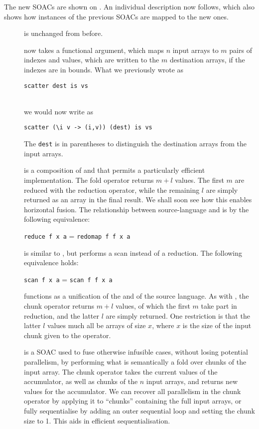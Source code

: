 The new SOACs are shown on .  An individual
description now follows, which also shows how instances of the
previous SOACs are mapped to the new ones.

\begin{description}
\item[{}] is unchanged from before.
\item[{}] now takes a functional argument, which maps $n$
  input arrays to $m$ pairs of indexes and values, which are written
  to the $m$ destination arrays, if the indexes are in bounds.
  What we previously wrote as\\
  \centerline{\lstinline{scatter dest is vs}}\\
  we would now write as\\
  \centerline{\lstinline{scatter (\i v -> (i,v)) (dest) is vs}} The
  \lstinline{dest} is in parentheses to distinguish the destination
  arrays from the input arrays.
\item[] is a composition of  and  that
  permits a particularly efficient implementation.    The  fold operator returns $m+l$ values.
  The first $m$ are reduced with the reduction operator, while the
  remaining $l$ are simply returned as an array in the final result.
  We shall soon see how this enables horizontal fusion.  The
  relationship between source-language  and  is
  by the
  following equivalence:\\
  \centerline{\lstinline{reduce f x a} = \lstinline{redomap f f x a}}
\item[] is similar to , but performs a scan
  instead of a reduction.  The following equivalence holds:\\
  \centerline{\lstinline{scan f x a} = \lstinline{scan f f x a}}
\item[] functions as a unification of the
   and  of the source language.  As
  with , the chunk operator returns $m+l$ values, of which
  the first $m$ take part in reduction, and the latter $l$ are simply
  returned.  One restriction is that the latter $l$ values much all be
  arrays of size $x$, where $x$ is the size of the input chunk given
  to the operator.
\item[] is a SOAC used to fuse otherwise infusible
  cases, without losing potential parallelism, by performing what is
  semantically a fold over chunks of the input array.  The chunk
  operator takes the current values of the accumulator, as well as
  chunks of the $n$ input arrays, and returns new values for the
  accumulator.  We can recover all parallelism in the chunk operator
  by applying it to ``chunks'' containing the full input arrays, or
  fully sequentialise by adding an outer sequential loop and setting
  the chunk size to 1.  This aids in efficient sequentialisation.
\end{description}

